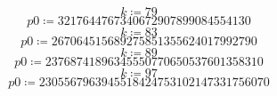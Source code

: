 \documentclass[11pt,a4paper,fleqn]{article}
\begin{document}
\begin{enumerate}[1.]
\begin{enumerate}[(a)]
\begin{flushleft}
\begin{mdframed}
\begin{dmath*}
                        k \coloneqq 79
                    \end{dmath*}
                    \vspace{-\bigskipamount}
                    \begin{dmath*}
                        \mathit{p0} \coloneqq 3217644767340672907899084554130
                    \end{dmath*}
                    \vspace{-\bigskipamount}
                    \begin{dmath*}
                        k \coloneqq 83
                    \end{dmath*}
                    \vspace{-\bigskipamount}
                    \begin{dmath*}
                        \mathit{p0} \coloneqq 267064515689275851355624017992790
                    \end{dmath*}
                    \vspace{-\bigskipamount}
                    \begin{dmath*}
                        k \coloneqq 89
                    \end{dmath*}
                    \vspace{-\bigskipamount}
                    \begin{dmath*}
                        \mathit{p0} \coloneqq 23768741896345550770650537601358310
                    \end{dmath*}
                    \vspace{-\bigskipamount}
                    \begin{dmath*}
                        k \coloneqq 97
                    \end{dmath*}
                    \vspace{-\bigskipamount}
                    \begin{dmath*}
                        \mathit{p0} \coloneqq 2305567963945518424753102147331756070
                    \end{dmath*}
                    \vspace{-\bigskipamount}
                    \begin{dmath*}

\end{dmath*}
\end{mdframed}
\end{flushleft}
\end{enumerate}
\end{enumerate}
\end{document}
